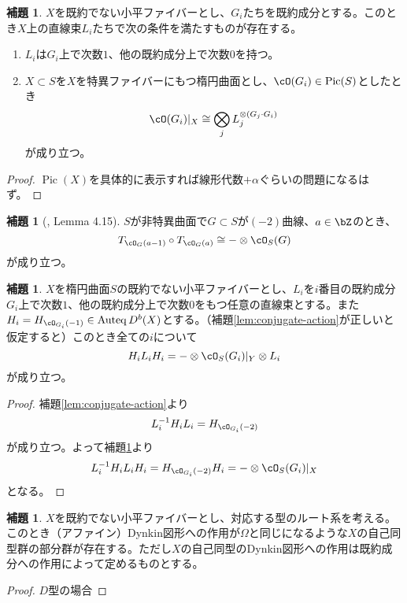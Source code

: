 \documentclass[uplatex, a4paper, dvipdfmx]{jsarticle}
\theoremstyle{definition}
\newtheorem{lemma}[theorem]{補題}
\DeclareMathOperator{\Auteq}{\mathrm{Auteq}}
\DeclareMathOperator{\Pic}{\mathrm{Pic}}
\begin{document}
\begin{lemma}\label{lem:special-line-bundles}
    $X$を既約でない小平ファイバーとし、$G_i$たちを既約成分とする。このとき$X$上の直線束$L_i$たちで次の条件を満たすものが存在する。
    \begin{enumerate}
        \item $L_i$は$G_i$上で次数$1$、他の既約成分上で次数$0$を持つ。
        \item $X \subset S$を$X$を特異ファイバーにもつ楕円曲面とし、$\cO(G_i) \in \Pic(S)$としたとき
              \begin{equation}
                  \cO(G_i)\vert_X \cong \bigotimes_j L_j^{\otimes (G_j\cdot G_i)}
              \end{equation}
              が成り立つ。
    \end{enumerate}
\end{lemma}
\begin{proof}
    $\Pic(X)$を具体的に表示すれば線形代数$+\alpha$ぐらいの問題になるはず。
\end{proof}
\begin{lemma}[{\cite{MR2198807}, Lemma 4.15}]\label{lem:composition-of-twists}
    $S$が非特異曲面で$G \subset S$が$(-2)$曲線、$a \in \bZ$のとき、
    \begin{equation}
        T_{\cO_G(a-1)}\circ T_{\cO_G(a)} \cong -\otimes \cO_S(G)
    \end{equation}
    が成り立つ。
\end{lemma}
\begin{lemma}
    $X$を楕円曲面$S$の既約でない小平ファイバーとし、$L_i$を$i$番目の既約成分$G_i$上で次数$1$、他の既約成分上で次数$0$をもつ任意の直線束とする。また$H_i = H_{\cO_{G_i}(-1)} \in \Auteq D^b(X)$とする。（補題\ref{lem:conjugate-action}が正しいと仮定すると）このとき全ての$i$について
    \begin{equation}
        H_iL_iH_i = -\otimes \cO_S(G_i)\vert_Y \otimes L_i
    \end{equation}
    が成り立つ。
\end{lemma}
\begin{proof}
    補題\ref{lem:conjugate-action}より
    \begin{equation}
        L_i^{-1}H_iL_i = H_{\cO_{G_i}(-2)}
    \end{equation}
    が成り立つ。よって補題\ref{lem:composition-of-twists}より
    \begin{equation}
        L_i^{-1}H_iL_iH_i = H_{\cO_{G_i}(-2)}H_i = -\otimes \cO_S(G_i)\vert_X
    \end{equation}
    となる。
\end{proof}
\begin{lemma}\label{lem:omega_in_automorphisms}
    $X$を既約でない小平ファイバーとし、対応する型のルート系を考える。このとき（アファイン）Dynkin図形への作用が$\Omega$と同じになるような$X$の自己同型群の部分群が存在する。ただし$X$の自己同型のDynkin図形への作用は既約成分への作用によって定めるものとする。
\end{lemma}
\begin{proof}
    $D$型の場合
\end{proof}
\end{document}
